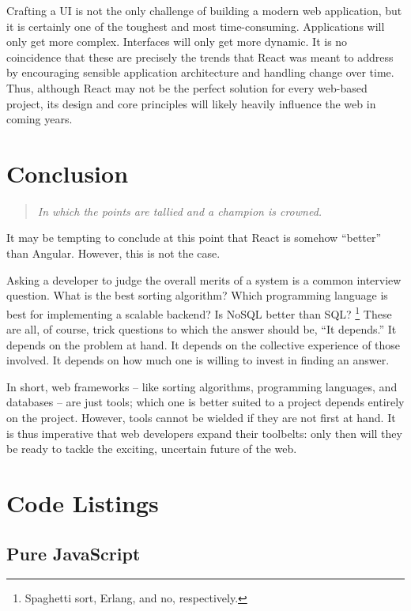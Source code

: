 \documentclass[12pt,letterpaper]{article}
\begin{document}
Crafting a UI is not the only challenge of building a modern web application, but it is certainly one of the toughest and most time-consuming. Applications will only get more complex. Interfaces will only get more dynamic. It is no coincidence that these are precisely the trends that React was meant to address by encouraging sensible application architecture and handling change over time. Thus, although React may not be the perfect solution for every web-based project, its design and core principles will likely heavily influence the web in coming years.


\section{Conclusion}
\vspace{-12pt}

\begin{quote}
	\singlespacing
	\emph{In which the points are tallied and a champion is crowned.}
\end{quote}

It may be tempting to conclude at this point that React is somehow ``better'' than Angular. However, this is not the case.

Asking a developer to judge the overall merits of a system is a common interview question. What is the best sorting algorithm? Which programming language is best for implementing a scalable backend? Is NoSQL better than SQL? \footnote{Spaghetti sort, Erlang, and no, respectively.} These are all, of course, trick questions to which the answer should be, ``It depends.'' It depends on the problem at hand. It depends on the collective experience of those involved. It depends on how much one is willing to invest in finding an answer.

In short, web frameworks -- like sorting algorithms, programming languages, and databases -- are just tools; which one is better suited to a project depends entirely on the project. However, tools cannot be wielded if they are not first at hand. It is thus imperative that web developers expand their toolbelts: only then will they be ready to tackle the exciting, uncertain future of the web.


\newpage

\appendix
\section{Code Listings}
\label{app:code}

\subsection*{Pure JavaScript}
\end{document}

